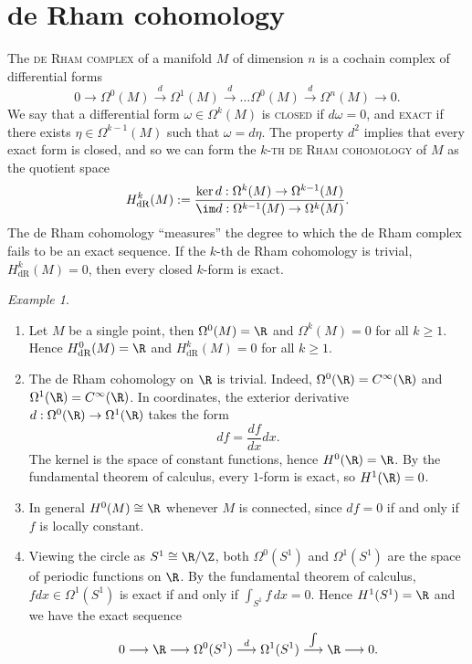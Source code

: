 \documentclass[reqno]{amsart}
\theoremstyle{definition}
\theoremstyle{remark}
\newtheorem*{example}{Example}
\renewcommand{\emph}{\textsc}
\begin{document}
\section{de Rham cohomology}

The \emph{de Rham complex} of a manifold $M$ of dimension $n$ is a cochain complex of differential forms
	\[ 0 \longrightarrow \Omega^0 (M) \overset{d}{\longrightarrow}  \Omega^1 (M) \overset{d}{\longrightarrow} \dots \Omega^0 (M) \overset{d}{\longrightarrow} \Omega^n (M) \longrightarrow 0. \]
We say that a differential form $\omega \in \Omega^k (M)$ is \emph{closed} if $d\omega = 0$, and \emph{exact} if there exists $\eta \in \Omega^{k - 1} (M)$ such that $\omega = d \eta$. The property $d^2$ implies that every exact form is closed, and so we can form the \emph{$k$-th de Rham cohomology} of $M$ as the quotient space
	\[ H^k_{\text{dR}} (M) := \frac{\ker d : \Omega^k (M) \to \Omega^{k - 1} (M)}{\im d : \Omega^{k - 1} (M) \to \Omega^k (M)}. \]
The de Rham cohomology ``measures'' the degree to which the de Rham complex fails to be an exact sequence. If the $k$-th de Rham cohomology is trivial, $H^k_{\text{dR}} (M) = 0$, then every closed $k$-form is exact. 

\begin{example}
\leavevmode
\begin{enumerate}
	\item Let $M$ be a single point, then $\Omega^0 (M) = \R$ and $\Omega^k (M) = 0$ for all $k \geq 1$. Hence $H^0_{\text{dR}} (M) = \R$ and $H^k_{\text{dR}} (M) = 0$ for all $k \geq 1$. 
	
	\item The de Rham cohomology on $\R$ is trivial. Indeed, $\Omega^0 (\R) = C^\infty (\R)$ and $\Omega^1 (\R) = C^\infty (\R)$. In coordinates, the exterior derivative $d: \Omega^0 (\R) \to \Omega^1 (\R)$ takes the form
		\[ df = \frac{df}{dx} dx. \]
	The kernel is the space of constant functions, hence $H^0 (\R) = \R$. By the fundamental theorem of calculus, every $1$-form is exact, so $H^1 (\R) = 0$. 	
	
	\item In general $H^0 (M) \cong \R$ whenever $M$ is connected, since $df = 0$ if and only if $f$ is locally constant. 
	
	\item Viewing the circle as $S^1 \cong \R/\Z$, both $\Omega^0 (S^1)$ and $\Omega^1 (S^1)$ are the space of periodic functions on $\R$. By the fundamental theorem of calculus, $f dx \in \Omega^1 (S^1)$ is exact if and only if $\int_{S^1} f \, dx = 0$. Hence $H^1 (S^1) = \R$ and we have the exact sequence 
		\[ 0 \longrightarrow \R \longrightarrow \Omega^0 (S^1) \overset{d}{\longrightarrow} \Omega^1 (S^1) \overset{\int}{\longrightarrow} \R \longrightarrow 0. \]
\end{enumerate}
\end{example}
\end{document}
